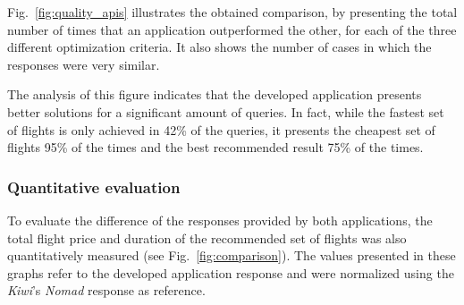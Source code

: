 \documentclass[onecolumn]{elsarticle}
\begin{document}
Fig.~\ref{fig:quality_apis} illustrates the obtained comparison, by presenting the total number of times that an application outperformed the other, for each of the three different optimization criteria. It also shows the number of cases in which the responses were very similar.

The analysis of this figure indicates that the developed application presents better solutions for a significant amount of queries. In fact, while the fastest set of flights is only achieved in 42\% of the queries, it presents the cheapest set of flights 95\% of the times and the best recommended result 75\% of the times.  


\subsubsection{Quantitative evaluation}

To evaluate the difference of the responses provided by both applications, the total flight price and duration of the recommended set of flights was also quantitatively measured (see Fig.~\ref{fig:comparison}). The values presented in these graphs refer to the developed application response and were normalized using the \textit{Kiwi}'s \textit{Nomad} response as reference. 
\end{document}
